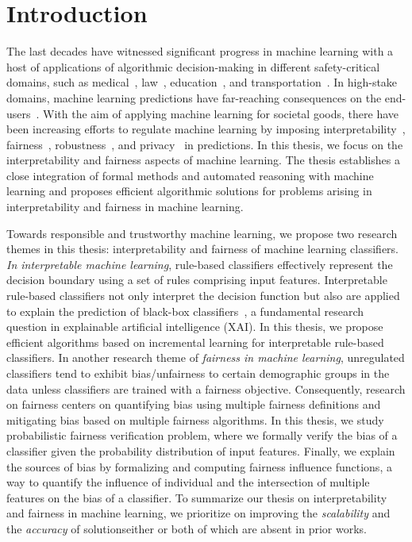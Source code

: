 \chapter{Introduction}
The last decades have witnessed significant progress in machine learning with a host of applications of algorithmic decision-making in different safety-critical domains, such as medical~\cite{erickson2017machine,kaissis2020secure,kononenko2001machine}, law~\cite{kumar2018law,surden2014machine}, education~\cite{luckin2018machine}, and transportation~\cite{peled2019model,zantalis2019review}. In high-stake domains,  machine learning predictions have far-reaching consequences on the end-users~\cite{eshete2021making}. With the aim of applying machine learning for societal goods, there have been increasing efforts to regulate machine learning by imposing interpretability~\cite{rudin2019stop}, fairness~\cite{barocas2017fairness}, robustness~\cite{rauber2017foolbox}, and privacy~\cite{papernot2016towards} in predictions. In this thesis, we focus on the interpretability and fairness aspects of machine learning. The thesis establishes a close integration of formal methods and automated reasoning with machine learning and proposes efficient algorithmic solutions for problems arising in interpretability and fairness in machine learning.

Towards responsible and trustworthy machine learning, we propose two research themes in this thesis: interpretability and fairness of machine learning classifiers. \emph{In interpretable machine learning}, rule-based classifiers effectively represent the decision boundary using a set of rules comprising input features. Interpretable rule-based classifiers not only interpret the decision function but also are applied to explain the prediction of black-box classifiers~\cite{gill2020responsible,lundberg2017unified,moradi2021post,ribeiro2016should,slack2020fooling}, a fundamental research question in explainable artificial intelligence (XAI). In this thesis, we propose efficient algorithms based on incremental learning for interpretable rule-based classifiers. In another research theme of \emph{fairness in machine learning}, unregulated classifiers tend to exhibit bias/unfairness to certain demographic groups in the data unless classifiers are trained with a fairness objective. Consequently, research on fairness centers on quantifying bias using multiple fairness definitions and mitigating bias based on multiple fairness algorithms. In this thesis, we study probabilistic fairness verification problem, where we formally verify the bias of a classifier given the probability distribution of input features. Finally, we explain the sources of bias by formalizing and computing fairness influence functions, a way to quantify the influence of individual and the intersection of multiple features on the bias of a classifier. To summarize our thesis on interpretability and fairness in machine learning, we prioritize on improving the \emph{scalability} and the \emph{accuracy} of solutions\textemdash either or both of which are absent in prior works. 




